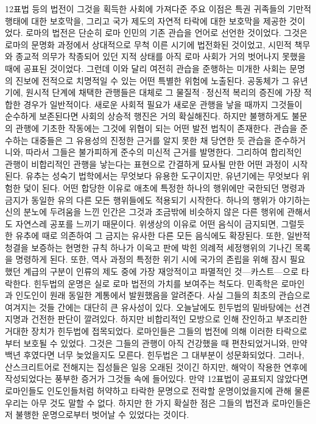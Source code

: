 12표법 등의 법전이 그것을 획득한 사회에 가져다준 주요 이점은
특권 귀족들의 기만적 행태에 대한 보호막을,
그리고 국가 제도의 자연적 타락에 대한 보호막을 제공한 것이었다.
로마의 법전은 단순히 로마 인민의 기존 관습을 언어로 선언한 것이었다.
그것은 로마의 문명화 과정에서 상대적으로 무척 이른 시기에 법전화된 것이었고,
시민적 책무와 종교적 의무가 착종되어 있던 지적 상태를 아직
로마 사회가 거의 벗어나지 못했을 때에 공표된 것이었다.
그런데 이와 달리 여전히 관습을 준행하는 미개한 사회는
문명의 진보에 전적으로 치명적일 수 있는 어떤 특별한 위험에 노출된다.
공동체가 그 유년기에, 원시적 단계에 채택한 관행들은
대체로 그 물질적^^b7정신적 복리의 증진에 가장 적합한 경우가 일반적이다.
새로운 사회적 필요가 새로운 관행을 낳을 때까지 그것들이 순수하게 보존된다면
사회의 상승적 행진은 거의 확실해진다.
하지만 불행하게도 불문의 관행에 기초한 작동에는 그것에 위협이 되는
어떤 발전 법칙이 존재한다.
관습을 준수하는 대중들은 그 유용성의 진정한 근거를 알지 못한 채
당연한 듯 관습을 준수하거니와,
따라서 그들은 불가피하게 준수의 미신적 근거를 발명한다.
그리하여 합리적인 관행이 비합리적인 관행을 낳는다는 표현으로
간결하게 묘사될 만한 어떤 과정이 시작된다.
유추는 성숙기 법학에서는 무엇보다 유용한 도구이지만,
유년기에는 무엇보다 위험한 덫이 된다.
어떤 합당한 이유로 애초에 특정한 하나의 행위에만 국한되던 명령과 금지가
동일한 유의 다른 모든 행위들에도 적용되기 시작한다.
하나의 행위가 야기하는 신의 분노에 두려움을 느낀 인간은
그것과 조금밖에 비슷하지 않은 다른 행위에 관해서도
자연스레 공포를 느끼기 때문이다.
위생상의 이유로 어떤 음식이 금지되면,
그럴듯한 유추에 때로 의존하여
그 금지는 유사한 다른 모든 음식에도 확장된다.
또한, 일반적 청결을 보증하는 현명한 규칙 하나가 이윽고
판에 박힌 의례적 세정행위의 기나긴 목록을 명령하게 된다.
또한, 역사 과정의 특정한 위기 시에 국가의 존립을 위해 잠시 필요했던
계급의 구분이 인류의 제도 중에 가장 재앙적이고 파멸적인 것---카스트---으로
타락한다.
힌두법의 운명은 실로 로마 법전의 가치를 보여주는 척도다.
민족학은 로마인과 인도인이 원래 동일한 계통에서 발원했음을 알려준다.
사실 그들의 최초의 관습으로 여겨지는 것들 간에는
대단히 큰 유사성이 있다.
오늘날에도 힌두법의 밑바탕에는 선견지명과 건전한 판단이 깔려있다.
하지만 비합리적인 모방으로 인해 잔인하고 부조리한 거대한 장치가
힌두법에 접목되었다.
로마인들은 그들의 법전에 의해 이러한 타락으로부터 보호될 수 있었다.
그것은 그들의 관행이 아직 건강했을 때 편찬되었거니와,
만약 백년 후였다면 너무 늦었을지도 모른다.
힌두법은 그 대부분이 성문화되었다.
그러나,
산스크리트어로 전해지는 집성들은 일응 오래된 것이긴 하지만,
해악이 작용한 연후에 작성되었다는 풍부한 증거가 그것들 속에 들어있다.
만약 12표법이 공표되지 않았다면 로마인들도 인도인들처럼
허약하고 타락한 문명으로 전락할 운명이었을지에 관해
물론 우리는 아무 것도 말할 수 없다.
하지만 한 가지 확실한 점은 그들의 법전과 
로마인들은 저 불행한 운명으로부터 벗어날 수 있었다는 것이다.


